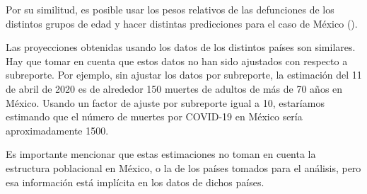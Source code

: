 Por su similitud, es posible usar los pesos relativos de las defunciones de los distintos grupos de edad y  hacer distintas predicciones para el caso de México ().


Las proyecciones obtenidas usando los datos de los distintos países son similares. Hay que tomar en cuenta que estos datos no han sido ajustados con respecto a subreporte. Por ejemplo, sin ajustar los datos por subreporte, la estimación del 11 de abril de 2020 es  de alrededor 150 muertes de adultos de más de 70 años en México. 
Usando un factor de ajuste por subreporte igual a 10, estaríamos estimando que el número de muertes por COVID-19 en México sería aproximadamente 1500. 


Es importante mencionar que estas estimaciones no toman en cuenta la estructura poblacional en México, o la de los países tomados para el análisis, pero esa información está implícita en los datos de dichos países. 






